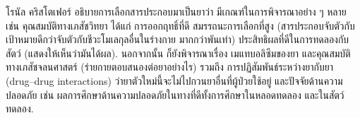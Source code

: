 {\begin{shaded}

%
%
%
%
%


โรนัล คริสโตเฟอร์
อธิบายการเลือกสารประกอบมาเป็นยาว่า
มีเกณฑ์ในการพิจารณาอย่าง ๆ หลาย เช่น
คุณสมบัติทางเภสัชวิทยา ได้แก่ การออกฤทธิ์ที่ดี สมรรถนะการเลือกที่สูง (สารประกอบจับตัวกับเป้าหมายดีกว่าจับตัวกับชีวะโมเลกุลอื่นในร่างกาย มากกว่าพันเท่า) ประสิทธิผลที่ดีในการทดลองกับสัตว์ (แสดงให้เห็นว่ามันได้ผล).
นอกจากนั้น ก็ยังพิจารณาเรื่อง เมแทบอลิซึมของยา และคุณสมบัติทางเภสัชจลนศาสตร์ (ร่ายกายตอบสนองต่อยาอย่างไร)
รวมถึง การปฏิสัมพันธ์ระหว่างยากับยา (drug–drug interactions) ว่ายาตัวใหม่นี้จะไม่ไปกวนยาอื่นที่ผู้ป่วยใช้อยู่
และปัจจัยด้านความปลอดภัย เช่น ผลการศึกษาด้านความปลอดภัยในทางที่ดีทั้งการศึกษาในหลอดทดลอง และในสัตว์ทดลอง.

%


\end{shaded}}
